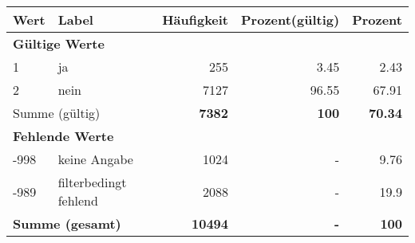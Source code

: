      \begin{longtable}{lXrrr}
     \toprule
     \textbf{Wert} & \textbf{Label} & \textbf{Häufigkeit} & \textbf{Prozent(gültig)} & \textbf{Prozent} \\
     \endhead
     \midrule
     \multicolumn{5}{l}{\textbf{Gültige Werte}}\\

     1 &
     \multicolumn{1}{X}{ ja   } &


       \num{255} &
       \num[round-mode=places,round-precision=2]{3.45} &
         \num[round-mode=places,round-precision=2]{2.43} \\

     2 &
     \multicolumn{1}{X}{ nein   } &


       \num{7127} &
       \num[round-mode=places,round-precision=2]{96.55} &
         \num[round-mode=places,round-precision=2]{67.91} \\
     \midrule
     \multicolumn{2}{l}{Summe (gültig)} &
       \textbf{\num{7382}} &
     \textbf{\num{100}} &
       \textbf{\num[round-mode=places,round-precision=2]{70.34}} \\
     \multicolumn{5}{l}{\textbf{Fehlende Werte}}\\
       -998 &
       keine Angabe &
         \num{1024} &
        - &
         \num[round-mode=places,round-precision=2]{9.76} \\
       -989 &
       filterbedingt fehlend &
         \num{2088} &
        - &
         \num[round-mode=places,round-precision=2]{19.9} \\
     \midrule
     \multicolumn{2}{l}{\textbf{Summe (gesamt)}} &
          \textbf{\num{10494}} &
        \textbf{-} &
        \textbf{\num{100}} \\
     \bottomrule
     \end{longtable}
     
